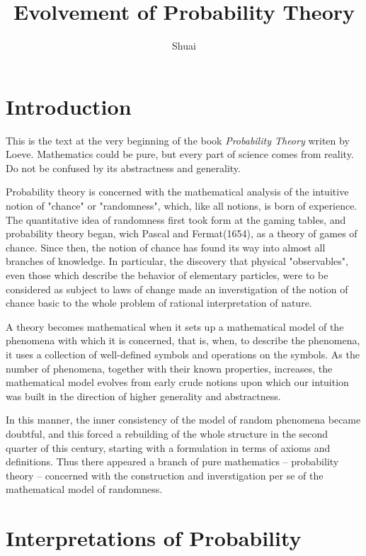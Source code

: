 \documentclass[a4paper]{article}
\title{Evolvement of Probability Theory}
\author{Shuai}
\date{}
\begin{document}
\maketitle
\tableofcontents
\pagebreak

\section{Introduction}

This is the text at the very beginning of the book \textit{Probability Theory} writen
by Loeve. Mathematics could be pure, but every part of science comes from
reality. Do not be confused by its abstractness and generality.

Probability theory is concerned with the mathematical analysis of the intuitive
notion of "chance" or "randomness", which, like all notions, is born of
experience. The quantitative idea of randomness first took form at the gaming
tables, and probability theory began, wich Pascal and Fermat(1654), as a theory
of games of chance. Since then, the notion of chance has found its way into
almost all branches of knowledge. In particular, the discovery that physical
"observables", even those which describe the behavior of elementary particles,
were to be considered as subject to laws of change made an inverstigation of
the notion of chance basic to the whole problem of rational interpretation of
nature.\cite{1977probability}

A theory becomes mathematical when it sets up a mathematical model of the
phenomena with which it is concerned, that is, when, to describe the phenomena,
it uses a collection of well-defined symbols and operations on the symbols. As
the number of phenomena, together with their known properties, increases, the
mathematical model evolves from early crude notions upon which our intuition
was built in the direction of higher generality and
abstractness.\cite{1977probability}

In this manner, the inner consistency of the model of random phenomena became
doubtful, and this forced a rebuilding of the whole structure in the second
quarter of this century, starting with a formulation in terms of axioms and
definitions. Thus there appeared a branch of pure mathematics -- probability
theory -- concerned with the construction and inverstigation per se of the
mathematical model of randomness.\cite{1977probability}

\section{Interpretations of Probability}
\end{document}
